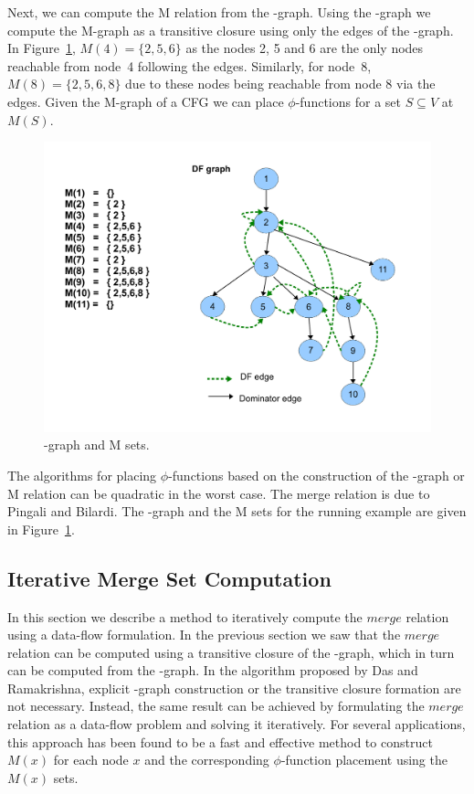 {Next, we can compute the M relation from the \DF-graph. 
Using the \DF-graph we compute the M-graph as a transitive closure
using only the \DF edges of the \DJ-graph. In Figure~\ref{fig:mgraph}, $M(4) = 
\{2,5,6\}$ as the nodes 2, 5 and 6 are the only nodes reachable from node~4 
following the \DF edges. Similarly, for node~8, $M(8) = \{2,5,6,8\}$ due to these nodes being reachable from node 8 via the \DF edges. Given the M-graph of a CFG we can place $\phi$-functions for a set $S \subseteq V$ at $M(S)$.

    \begin{figure}[htb]
    \centerline{\includegraphics[scale=0.4]{mgraph_1.pdf}}
    \caption{\DF-graph and M sets.}
    \label{fig:mgraph}
    \end{figure} 


The algorithms for placing $\phi$-functions based on the construction of the 
\DF-graph or M relation can be quadratic in the worst case. The merge relation 
is due to Pingali and Bilardi. The \DF-graph and the M sets for the running 
example are given in Figure~\ref{fig:mgraph}.

\subsection{Iterative Merge Set Computation}
In this section we describe a method to iteratively compute the 
$\textit{merge}$ relation using a data-flow formulation. In the previous section 
we saw that the $\textit{merge}$ relation can be computed using a transitive 
closure of the \DF-graph, which in turn can be computed from the \DJ-graph. In 
the algorithm proposed by Das and Ramakrishna, explicit \DF-graph construction 
or the transitive closure formation are not necessary. Instead, the same result 
can be achieved by formulating the $\textit{merge}$ relation as a data-flow 
problem and solving it iteratively. For several applications, this approach has 
been found to be a fast and effective method to construct $M(x)$ for each node 
$x$ and the corresponding $\phi$-function placement using the $M(x)$ sets. 

}
